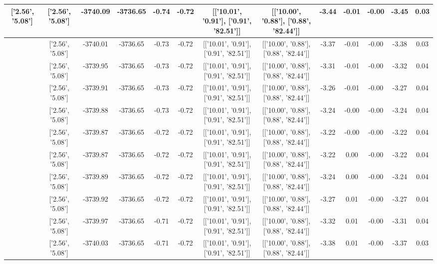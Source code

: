 \begin{table}[htbp]
\begin{adjustbox}{angle=90}
\begin{tabular}{|c|c|c|c|c|c|c|c|c|c|c|c|c|}
 ['2.56', '5.08'] & ['2.56', '5.08'] & -3740.09 & -3736.65 & -0.74 & -0.72 & [['10.01', '0.91'], ['0.91', '82.51']] & [['10.00', '0.88'], ['0.88', '82.44']] & -3.44 & -0.01 & -0.00 & -3.45 & 0.03\\ \hline
 ['2.56', '5.08'] & ['2.56', '5.08'] & -3740.01 & -3736.65 & -0.73 & -0.72 & [['10.01', '0.91'], ['0.91', '82.51']] & [['10.00', '0.88'], ['0.88', '82.44']] & -3.37 & -0.01 & -0.00 & -3.38 & 0.03\\ \hline
 ['2.56', '5.08'] & ['2.56', '5.08'] & -3739.95 & -3736.65 & -0.73 & -0.72 & [['10.01', '0.91'], ['0.91', '82.51']] & [['10.00', '0.88'], ['0.88', '82.44']] & -3.31 & -0.01 & -0.00 & -3.32 & 0.04\\ \hline
 ['2.56', '5.08'] & ['2.56', '5.08'] & -3739.91 & -3736.65 & -0.73 & -0.72 & [['10.01', '0.91'], ['0.91', '82.51']] & [['10.00', '0.88'], ['0.88', '82.44']] & -3.26 & -0.01 & -0.00 & -3.27 & 0.04\\ \hline
 ['2.56', '5.08'] & ['2.56', '5.08'] & -3739.88 & -3736.65 & -0.73 & -0.72 & [['10.01', '0.91'], ['0.91', '82.51']] & [['10.00', '0.88'], ['0.88', '82.44']] & -3.24 & -0.00 & -0.00 & -3.24 & 0.04\\ \hline
 ['2.56', '5.08'] & ['2.56', '5.08'] & -3739.87 & -3736.65 & -0.72 & -0.72 & [['10.01', '0.91'], ['0.91', '82.51']] & [['10.00', '0.88'], ['0.88', '82.44']] & -3.22 & -0.00 & -0.00 & -3.22 & 0.04\\ \hline
 ['2.56', '5.09'] & ['2.56', '5.08'] & -3739.87 & -3736.65 & -0.72 & -0.72 & [['10.01', '0.91'], ['0.91', '82.51']] & [['10.00', '0.88'], ['0.88', '82.44']] & -3.22 & 0.00 & -0.00 & -3.22 & 0.04\\ \hline
 ['2.57', '5.09'] & ['2.56', '5.08'] & -3739.89 & -3736.65 & -0.72 & -0.72 & [['10.01', '0.91'], ['0.91', '82.51']] & [['10.00', '0.88'], ['0.88', '82.44']] & -3.24 & 0.00 & -0.00 & -3.24 & 0.04\\ \hline
 ['2.57', '5.09'] & ['2.56', '5.08'] & -3739.92 & -3736.65 & -0.72 & -0.72 & [['10.01', '0.91'], ['0.91', '82.51']] & [['10.00', '0.88'], ['0.88', '82.44']] & -3.27 & 0.01 & -0.00 & -3.27 & 0.04\\ \hline
 ['2.57', '5.09'] & ['2.56', '5.08'] & -3739.97 & -3736.65 & -0.71 & -0.72 & [['10.01', '0.91'], ['0.91', '82.51']] & [['10.00', '0.88'], ['0.88', '82.44']] & -3.32 & 0.01 & -0.00 & -3.31 & 0.04\\ \hline
 ['2.57', '5.09'] & ['2.56', '5.08'] & -3740.03 & -3736.65 & -0.71 & -0.72 & [['10.01', '0.91'], ['0.91', '82.51']] & [['10.00', '0.88'], ['0.88', '82.44']] & -3.38 & 0.01 & -0.00 & -3.37 & 0.03\\ \hline

\end{tabular}
\end{adjustbox}
\end{table}
